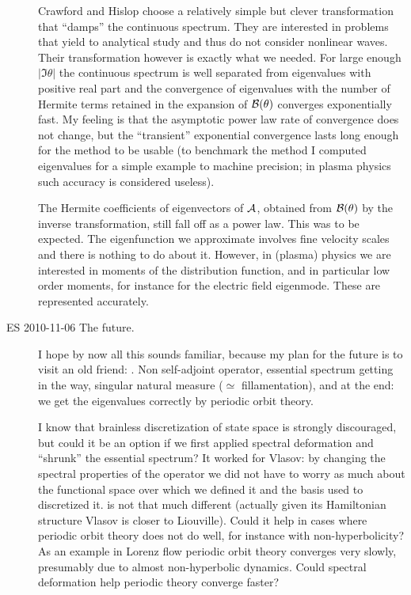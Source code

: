 \begin{description}
Crawford and Hislop choose a relatively simple but clever transformation that
``damps'' the continuous spectrum. They are interested in problems
that yield to analytical study and thus do not consider nonlinear
waves. Their transformation however is exactly what we needed. For large enough
$|\Im\theta|$ the continuous spectrum is well separated from eigenvalues with
positive real part and the convergence of eigenvalues with the number of
Hermite terms retained in the expansion of $\mathcal{B}(\theta)$ converges
exponentially fast. My feeling is that the asymptotic power law
rate of convergence does not change, but the ``transient'' exponential
convergence lasts long enough for the method to be usable (to benchmark
the method I computed eigenvalues for a simple example to machine precision;
in plasma physics such accuracy is considered useless).

The Hermite coefficients of eigenvectors of $\mathcal{A}$,
obtained from $\mathcal{B}(\theta)$ by the inverse
transformation, still fall off as a power law.
This was to be expected. The eigenfunction we approximate involves fine
velocity scales and there is nothing to do about it. However, in (plasma)
physics we are interested in moments of the distribution function, and in
particular low order moments, for instance for the electric field eigenmode.
These are represented accurately.

\item[ES 2010-11-06 The future.] I hope by now all this sounds familiar,
because my plan for the future is to visit an old friend:
\FPoper. Non self-adjoint operator, essential spectrum getting in the way,
singular natural measure ($\simeq$ fillamentation),
and at the end: we get the eigenvalues correctly
by periodic orbit theory.

I know that brainless discretization of state space is strongly discouraged, but could
it be an option if we first applied spectral deformation and ``shrunk'' the essential
spectrum? It worked for Vlasov: by changing the spectral properties of the operator
we did not have to worry as much about the functional space over which we defined
it and the basis used to discretized it.
{\FPoper} is not that much different
(actually given its Hamiltonian structure Vlasov is closer to Liouville).
Could it help in cases where periodic orbit theory does not do well, for instance
with non-hyperbolicity? As an example in Lorenz flow periodic orbit theory
converges very slowly, presumably due to almost non-hyperbolic dynamics.
Could spectral deformation help periodic theory converge faster?


\end{description}

